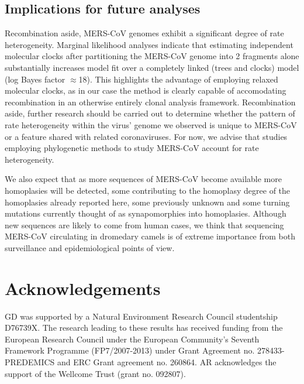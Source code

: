 \documentclass[11pt,oneside,letterpaper]{article}
\begin{document}
\subsection*{Implications for future analyses}
Recombination aside, MERS-CoV genomes exhibit a significant degree of rate heterogeneity.
Marginal likelihood analyses indicate that estimating independent molecular clocks after partitioning the MERS-CoV genome into 2 fragments alone substantially increases model fit over a completely linked (trees and clocks) model (log Bayes factor $\approx$18).
This highlights the advantage of employing relaxed molecular clocks, as in our case the method is clearly capable of accomodating recombination in an otherwise entirely clonal analysis framework.
Recombination aside, further research should be carried out to determine whether the pattern of rate heterogeneity within the virus' genome we observed is unique to MERS-CoV or a feature shared with related coronaviruses.
For now, we advise that studies employing phylogenetic methods to study MERS-CoV account for rate heterogeneity.

We also expect that as more sequences of MERS-CoV become available more homoplasies will be detected, some contributing to the homoplasy degree of the homoplasies already reported here, some previously unknown and some turning mutations currently thought of as synapomorphies into homoplasies.
Although new sequences are likely to come from human cases, we think that sequencing MERS-CoV circulating in dromedary camels is of extreme importance from both surveillance and epidemiological points of view.

\section*{Acknowledgements}
GD was supported by a Natural Environment Research Council studentship D76739X.
The research leading to these results has received funding from the European Research Council under the European Community's Seventh Framework Programme (FP7/2007-2013) under Grant Agreement no. 278433-PREDEMICS and ERC Grant agreement no. 260864.
AR acknowledges the support of the Wellcome Trust (grant no. 092807).



\end{document}

